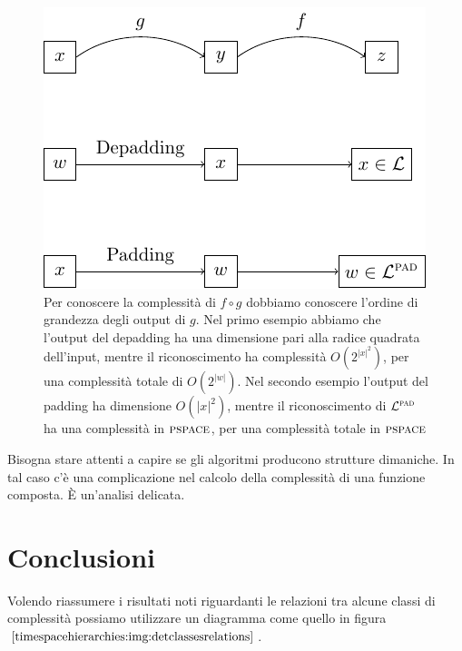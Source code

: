 \begin{figure}[!h]
    \begin{center}
        \includegraphics{./img/timespacehierarchies/FunctionsComposition.pdf}
        \caption{Per conoscere la complessità di $f \circ g$ dobbiamo conoscere l'ordine di
        grandezza degli output di $g$. Nel primo esempio abbiamo che l'output del depadding ha una
        dimensione pari alla radice quadrata dell'input, mentre il riconoscimento ha complessità
        $O(2^{|x|^{2}})$, per una complessità totale di $O(2^{|w|})$. Nel secondo esempio l'output
        del padding ha dimensione $O(|x|^{2})$, mentre il riconoscimento di $\mathcal{L}^{\textsc{pad}}$ ha una
        complessità in $\textsc{pspace}$, per una complessità totale in $\textsc{pspace}$}
    \end{center}
\end{figure}

Bisogna stare attenti a capire se gli algoritmi producono strutture dimaniche. In tal caso c'è una
complicazione nel calcolo della complessità di una funzione composta. È un'analisi delicata.

\section{Conclusioni}

Volendo riassumere i risultati noti riguardanti le relazioni tra alcune classi di complessità
possiamo utilizzare un diagramma come quello in figura $\ref{timespacehierarchies:img:detclassesrelations}$. 

